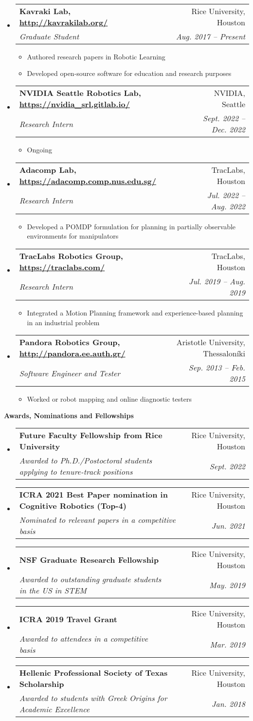 \documentclass[letterpaper,11pt]{article}
\makeatletter
\newcommand{\resitem}[1]{\item #1 \vspace{-2pt}}
\newcommand{\resheading}[1]{{\large \colorbox{mygrey}{\begin{minipage}{\textwidth}{\textbf{#1 \vphantom{p\^{E}}}}\end{minipage}}}}
\newcommand{\ressubheading}[4]{
\begin{tabular*}{7.0in}{l@{\extracolsep{\fill}}r}
		\textbf{#1} & #2 \\
		\textit{#3} & \textit{#4} \\
\end{tabular*}\vspace{-6pt}}
\makeatother
\begin{document}
\begin{itemize}
	
    \item
        \ressubheading{Kavraki Lab, \url{http://kavrakilab.org/}}
	{Rice University, Houston}{Graduate Student}
	{Aug. 2017 -- Present  }
	\begin{itemize}
		\resitem{Authored research papers in Robotic Learning}
		\resitem{Developed open-source software for education and research purposes}
	\end{itemize}
\item
\ressubheading{NVIDIA Seattle Robotics Lab, \url{https://nvidia_srl.gitlab.io/}}
{NVIDIA, Seattle}{Research Intern}
{Sept. 2022 -- Dec. 2022}
   \begin{itemize}
   \resitem{Ongoing }
   \end{itemize}
\item
\ressubheading{Adacomp Lab, \url{https://adacomp.comp.nus.edu.sg/}}
{TracLabs, Houston}{Research Intern}
{Jul. 2022 -- Aug. 2022}
    \begin{itemize}
	\resitem{Developed a POMDP formulation for planning in partially observable environments for    manipulators} 
    \end{itemize}
\item
    \ressubheading{TracLabs Robotics Group, \url{https://traclabs.com/}}
    {TracLabs, Houston}{Research Intern}
    {Jul. 2019 -- Aug. 2019}
    \begin{itemize}
    	\resitem{Integrated a Motion Planning framework and experience-based planning in an industrial problem}
    \end{itemize}
\item
     \ressubheading{Pandora Robotics Group, \url{http://pandora.ee.auth.gr/}}
	{Aristotle University, Thessaloníki}{Software Engineer and Tester}
	{Sep. 2013 -- Feb. 2015}
	\begin{itemize}
		\resitem{Worked or robot mapping and online diagnostic testers} 
	\end{itemize}
\end{itemize}
\resheading{Awards, Nominations and Fellowships}
\begin{itemize}
	\item
	\ressubheading{Future Faculty Fellowship from Rice University}
	{Rice University, Houston}{Awarded to  Ph.D./Postoctoral students applying to tenure-track positions }
	{Sept. 2022}
	\item
	\ressubheading{ICRA 2021 Best Paper nomination in Cognitive Robotics (Top-4)}
	{Rice University, Houston}{Nominated to relevant papers in a competitive basis}
	{Jun. 2021}
	\item
	\ressubheading{NSF Graduate Research Fellowship}
	{Rice University, Houston}{Awarded to outstanding graduate students in the US in STEM }{May. 2019}
	\item
	\ressubheading{ICRA 2019 Travel Grant}
	{Rice University, Houston}{Awarded to attendees in a competitive basis}{Mar. 2019}
	\item
	\ressubheading{Hellenic Professional Society of Texas Scholarship}
	{Rice University, Houston}{Awarded to students with Greek Origins for Academic Excellence}
	{Jan. 2018}
\end{itemize}
\end{document}
